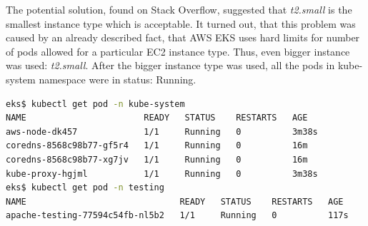 The potential solution, found on Stack Overflow, suggested that \textit{t2.small} is the smallest instance type which is acceptable\cite{eks-instance-problem-so}. It turned out, that this problem was caused by an already described fact, that AWS EKS uses hard limits for number of pods allowed for a particular EC2 instance type\cite{eks-hard-limits}. Thus, even bigger instance was used: \textit{t2.small}. After the bigger instance type was used, all the pods in kube-system namespace were in status: Running.
\begin{lstlisting}[basicstyle=\tiny,caption={TODO},captionpos=b,language=Bash,xleftmargin=1cm]
eks$ kubectl get pod -n kube-system
NAME                       READY   STATUS    RESTARTS   AGE
aws-node-dk457             1/1     Running   0          3m38s
coredns-8568c98b77-gf5r4   1/1     Running   0          16m
coredns-8568c98b77-xg7jv   1/1     Running   0          16m
kube-proxy-hgjml           1/1     Running   0          3m38s
eks$ kubectl get pod -n testing
NAME                              READY   STATUS    RESTARTS   AGE
apache-testing-77594c54fb-nl5b2   1/1     Running   0          117s
\end{lstlisting}

